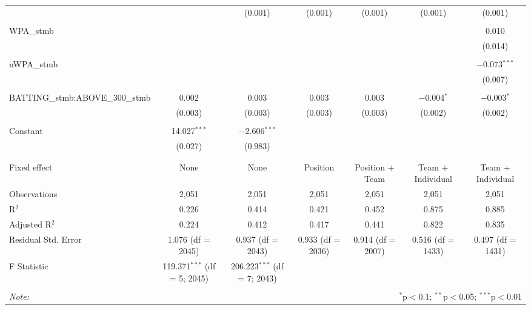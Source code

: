 \begin{table}[!htbp]
\begin{tabular}{@{\extracolsep{5pt}}lcccccc}
  &  & (0.001) & (0.001) & (0.001) & (0.001) & (0.001) \\
  & & & & & & \\
 WPA\_stmb &  &  &  &  &  & 0.010 \\
  &  &  &  &  &  & (0.014) \\
  & & & & & & \\
 nWPA\_stmb &  &  &  &  &  & $-$0.073$^{***}$ \\
  &  &  &  &  &  & (0.007) \\
  & & & & & & \\
 BATTING\_stmb:ABOVE\_300\_stmb & 0.002 & 0.003 & 0.003 & 0.003 & $-$0.004$^{*}$ & $-$0.003$^{*}$ \\
  & (0.003) & (0.003) & (0.003) & (0.003) & (0.002) & (0.002) \\
  & & & & & & \\
 Constant & 14.027$^{***}$ & $-$2.606$^{***}$ &  &  &  &  \\
  & (0.027) & (0.983) &  &  &  &  \\
  & & & & & & \\
\hline \\[-1.8ex]
Fixed effect & None & None & Position & Position + Team & Team + Individual & Team + Individual \\
Observations & 2,051 & 2,051 & 2,051 & 2,051 & 2,051 & 2,051 \\
R$^{2}$ & 0.226 & 0.414 & 0.421 & 0.452 & 0.875 & 0.885 \\
Adjusted R$^{2}$ & 0.224 & 0.412 & 0.417 & 0.441 & 0.822 & 0.835 \\
Residual Std. Error & 1.076 (df = 2045) & 0.937 (df = 2043) & 0.933 (df = 2036) & 0.914 (df = 2007) & 0.516 (df = 1433) & 0.497 (df = 1431) \\
F Statistic & 119.371$^{***}$ (df = 5; 2045) & 206.223$^{***}$ (df = 7; 2043) &  &  &  &  \\
\hline
\hline \\[-1.8ex]
\textit{Note:}  & \multicolumn{6}{r}{$^{*}$p$<$0.1; $^{**}$p$<$0.05; $^{***}$p$<$0.01} \\
\end{tabular}
\end{table}
